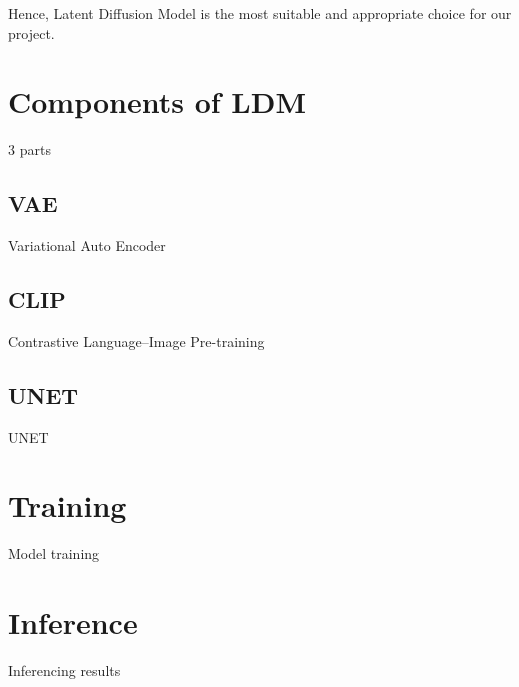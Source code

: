 Hence, Latent Diffusion Model is the most suitable and appropriate choice for our project. 



\section{Components of LDM}

3 parts

\subsection{VAE}

Variational Auto Encoder

\subsection{CLIP}

Contrastive Language–Image Pre-training

\subsection{UNET}

UNET

\section{Training}

Model training

\section{Inference}

Inferencing results